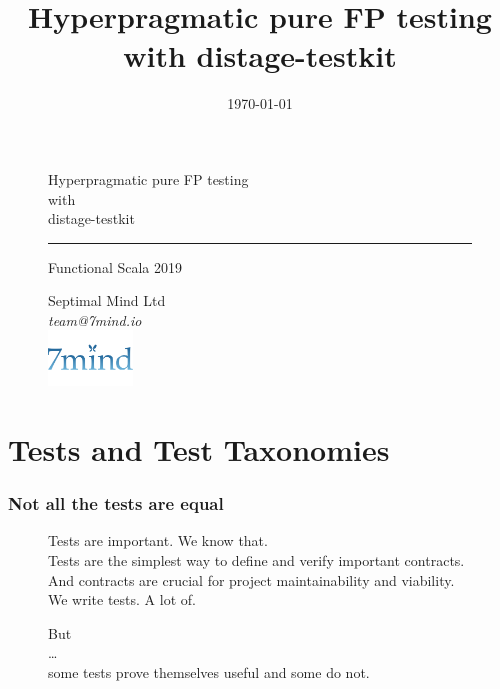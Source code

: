 \documentclass[usenames,dvipsnames,aspectratio=169]{beamer}
\title{Hyperpragmatic pure FP testing with distage-testkit}
\institute[Septimal Mind Ltd]
    {
    Septimal Mind Ltd\\
    \medskip
    \textit{team@7mind.io}
    }
\date{\today}
\begin{document}
\begin{frame}

\begin{figure}
\color{RubineRed}
\Huge Hyperpragmatic pure FP testing \\
with \\
distage-testkit

\rule{\linewidth}{1mm}

\normalsize Functional Scala 2019
\end{figure}

\begin{figure}
  Septimal Mind Ltd \\
  \textit{team@7mind.io} \\
  \includegraphics[width=0.2\textwidth]{media/logo_7mind.png}
\end{figure}

\end{frame}

\section{Tests and Test Taxonomies}

\begin{frame}
  \frametitle{Not all the tests are equal}

  \begin{figure}
  \Large
  Tests are important. We know that. \\
  Tests are the simplest way to define and verify important contracts. \\
  And contracts are crucial for project maintainability and viability. \\
  \Huge We write tests. A lot of. \\
  \end{figure}

  \begin{figure}
  \Large
  But \\
  \dots \\
  some tests prove themselves useful and some do not.
  \end{figure}
\end{frame}
\end{document}
